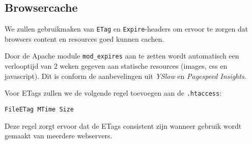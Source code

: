 \subsection{Browsercache}

We zullen gebruikmaken van \texttt{ETag} en \texttt{Expire}-headers om ervoor te zorgen dat browsers content en resources goed kunnen cachen.

Door de Apache module \texttt{mod\_expires} aan te zetten wordt automatisch een verlooptijd van 2 weken gegeven aan statische resources (images, css en javascript). Dit is conform de aanbevelingen uit \emph{YSlow} en \emph{Pagespeed Insights}.

Voor ETags zullen we de volgende regel toevoegen aan de \texttt{.htaccess}:
\begin{verbatim}
FileETag MTime Size
\end{verbatim}
Deze regel zorgt ervoor dat de ETags consistent zijn wanneer gebruik wordt gemaakt van meerdere webservers.